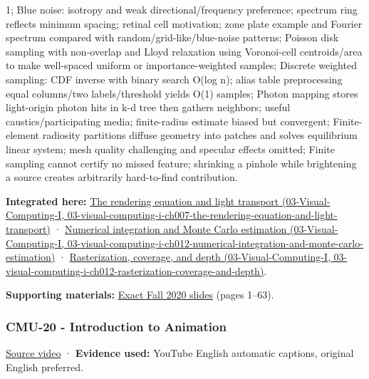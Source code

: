 1; Blue noise: isotropy and weak directional/frequency preference; spectrum ring reflects minimum spacing; retinal cell motivation; zone plate example and Fourier spectrum compared with random/grid-like/blue-noise patterns; Poisson disk sampling with non-overlap and Lloyd relaxation using Voronoi-cell centroids/area to make well-spaced uniform or importance-weighted samples; Discrete weighted sampling: CDF inverse with binary search O(log n); alias table preprocessing equal columns/two labels/threshold yields O(1) samples; Photon mapping stores light-origin photon hits in k-d tree then gathers neighbors; useful caustics/participating media; finite-radius estimate biased but convergent; Finite-element radiosity partitions diffuse geometry into patches and solves equilibrium linear system; mesh quality challenging and specular effects omitted; Finite sampling cannot certify no missed feature; shrinking a pinhole while brightening a source creates arbitrarily hard-to-find contribution.

\textbf{Integrated here:} \href{../03-Visual-Computing-I/main.pdf\#nameddest=03-visual-computing-i-ch007-the-rendering-equation-and-light-transport}{The rendering equation and light transport (03-Visual-Computing-I, 03-visual-computing-i-ch007-the-rendering-equation-and-light-transport)} · \href{../03-Visual-Computing-I/main.pdf\#nameddest=03-visual-computing-i-ch012-numerical-integration-and-monte-carlo-estimation}{Numerical integration and Monte Carlo estimation (03-Visual-Computing-I, 03-visual-computing-i-ch012-numerical-integration-and-monte-carlo-estimation)} · \href{../03-Visual-Computing-I/main.pdf\#nameddest=03-visual-computing-i-ch012-rasterization-coverage-and-depth}{Rasterization, coverage, and depth (03-Visual-Computing-I, 03-visual-computing-i-ch012-rasterization-coverage-and-depth)}.

\textbf{Supporting materials:} \href{https://15462.courses.cs.cmu.edu/fall2020content/lectures/19_variancereduction/19_variancereduction_slides.pdf}{Exact Fall 2020 slides} (pages 1--63).

\subsubsection{CMU-20 - Introduction to Animation}\label{04-visual-computing-ii-ch036-cmu-20---introduction-to-animation}

\href{https://www.youtube.com/watch?v=XVTw68iHef0}{Source video} · \textbf{Evidence used:} YouTube English automatic captions, original English preferred.

